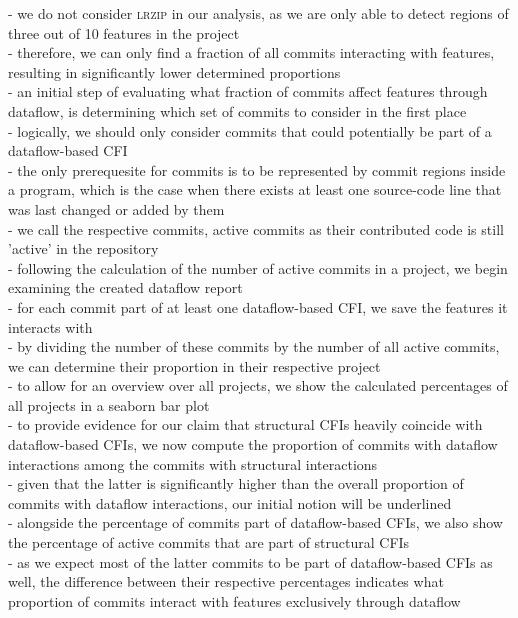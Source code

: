 - we do not consider \textsc{lrzip} in our analysis, as we are only able to detect regions of three out of 10 features in the project \\
- therefore, we can only find a fraction of all commits interacting with features, resulting in significantly lower determined proportions \\
- an initial step of evaluating what fraction of commits affect features through dataflow, is determining which set of commits to consider in the first place \\
- logically, we should only consider commits that could potentially be part of a dataflow-based CFI \\
- the only prerequesite for commits is to be represented by commit regions inside a program, which is the case when there exists at least one source-code line that was last changed or added by them \\
- we call the respective commits, \textsf{active} commits as their contributed code is still 'active' in the repository \\
- following the calculation of the number of active commits in a project, we begin examining the created dataflow report \\
- for each commit part of at least one dataflow-based CFI, we save the features it interacts with \\
- by dividing the number of these commits by the number of all active commits, we can determine their proportion in their respective project \\
- to allow for an overview over all projects, we show the calculated percentages of all projects in a \textsf{seaborn} bar plot \\
- to provide evidence for our claim that structural CFIs heavily coincide with dataflow-based CFIs, we now compute the proportion of commits with dataflow interactions among the commits with structural interactions \\
- given that the latter is significantly higher than the overall proportion of commits with dataflow interactions, our initial notion will be underlined \\
- alongside the percentage of commits part of dataflow-based CFIs, we also show the percentage of active commits that are part of structural CFIs \\
- as we expect most of the latter commits to be part of dataflow-based CFIs as well, the difference between their respective percentages indicates what proportion of commits interact with features exclusively through dataflow \\
